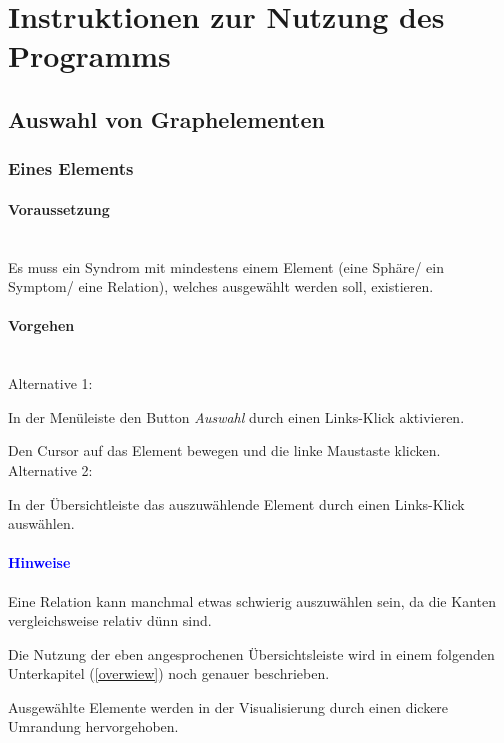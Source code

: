 \documentclass[enabledeprecatedfontcommands,fontsize=11pt,paper=a4,twoside]{scrartcl}
\newcounter{one}
\newcounter{two}[one]
\newcommand*{\hint}{\paragraph{\textcolor{blue}{Hinweise}}}
\newcommand*{\condition}{\paragraph{Voraussetzung}$\;$ \vspace{0.2cm}\\}
\newcommand*{\actions}{\paragraph{Vorgehen} $\;$\vspace{0.2cm}\\}
\newcommand*{\aOne}{\textcolor{bbe}{Alternative 1:}}
\newcommand*{\aTwo}{\textcolor{bbe}{Alternative 2:}}
\let\tempone\itemize
\let\temptwo\enditemize
\renewenvironment{itemize}{\tempone\addtolength{\itemsep}{-10.0pt}}{\temptwo}
\let\origenumerate\enumerate
\let\origendenumerate\endenumerate
\renewenvironment{enumerate}{\origenumerate \addtolength{\itemsep}{-10.0pt}}{\origendenumerate}
\begin{document}

\newpage
\section{Instruktionen zur Nutzung des Programms} \label{sec:nutzung}

		\subsection{Auswahl von Graphelementen} \label{pick}
	\subsubsection{Eines Elements}
	\condition
	Es muss ein Syndrom mit mindestens einem Element (eine Sphäre/ ein Symptom/ eine Relation), welches ausgewählt werden soll, existieren. 
	\actions
	\aOne 
	\begin{enumerate}
		\item In der Menüleiste den Button \textit{Auswahl} durch einen Links-Klick aktivieren. 
		\item Den Cursor auf das Element bewegen und die linke Maustaste klicken. 
	\end{enumerate}
	\aTwo
	\begin{enumerate}
		\item In der Übersichtleiste das auszuwählende Element durch einen Links-Klick auswählen. 
	\end{enumerate}
	\hint
	\begin{itemize}
		\item Eine Relation kann manchmal etwas schwierig auszuwählen sein, da die Kanten vergleichsweise relativ dünn sind. 
		\item Die Nutzung der eben angesprochenen Übersichtsleiste wird in einem folgenden Unterkapitel (\ref{overwiew}) noch genauer beschrieben.
		\item Ausgewählte Elemente werden in der Visualisierung durch einen dickere Umrandung hervorgehoben.
	\end{itemize}
	
\end{document}

